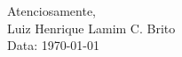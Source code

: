 \documentclass[11pt, a4paper]{article}
\begin{document}
\vspace{1cm} %
\begin{flushright}
	\textsf{\color{corporategray}Atenciosamente,}\\
	\textsf{\color{corporategray}Luiz Henrique Lamim C. Brito}\\
	\textsf{\color{corporategray}Data: \today}
\end{flushright}
\end{document}
